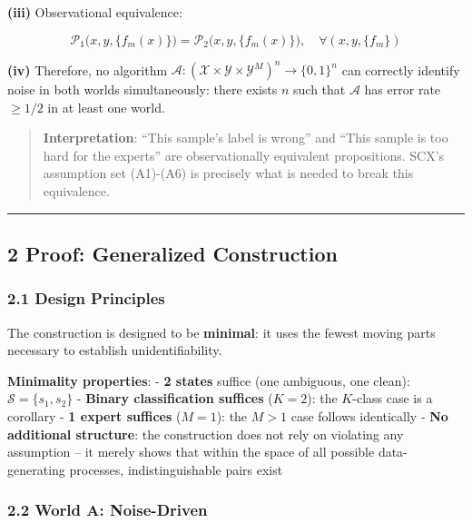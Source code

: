\documentclass[
  12pt,
]{ctexart}
\begin{document}
\textbf{(iii)} Observational equivalence:

\[\mathcal{P}_1\bigl(x, y, \{f_m(x)\}\bigr) = \mathcal{P}_2\bigl(x, y, \{f_m(x)\}\bigr), \quad \forall (x, y, \{f_m\})\]

\textbf{(iv)} Therefore, no algorithm
\(\mathcal{A}: (\mathcal{X} \times \mathcal{Y} \times \mathcal{Y}^M)^n \to \{0,1\}^n\)
can correctly identify noise in both worlds simultaneously: there exists
\(n\) such that \(\mathcal{A}\) has error rate \(\geq 1/2\) in at least
one world.

\begin{quote}
\textbf{Interpretation}: ``This sample's label is wrong'' and ``This
sample is too hard for the experts'' are observationally equivalent
propositions. SCX's assumption set (A1)-(A6) is precisely what is needed
to break this equivalence.
\end{quote}

\begin{center}\rule{0.5\linewidth}{0.5pt}\end{center}

\subsection{2 Proof: Generalized
Construction}\label{proof-generalized-construction}

\subsubsection{2.1 Design Principles}\label{design-principles}

The construction is designed to be \textbf{minimal}: it uses the fewest
moving parts necessary to establish unidentifiability.

\textbf{Minimality properties}: - \textbf{2 states} suffice (one
ambiguous, one clean): \(\mathcal{S} = \{s_1, s_2\}\) - \textbf{Binary
classification suffices} (\(K = 2\)): the \(K\)-class case is a
corollary - \textbf{1 expert suffices} (\(M = 1\)): the \(M > 1\) case
follows identically - \textbf{No additional structure}: the construction
does not rely on violating any assumption -- it merely shows that within
the space of all possible data-generating processes, indistinguishable
pairs exist

\subsubsection{2.2 World A: Noise-Driven}\label{world-a-noise-driven}
\end{document}
